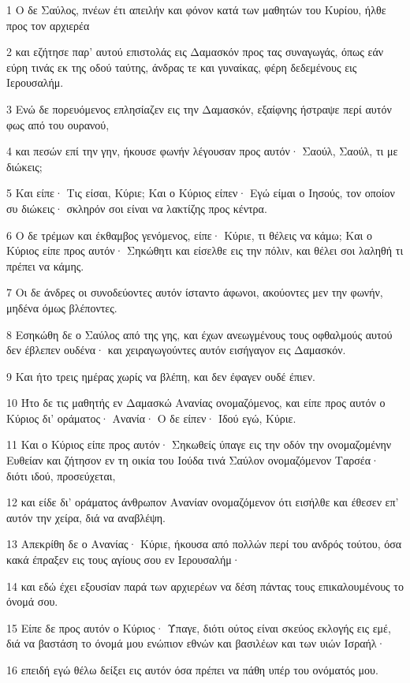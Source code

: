 \par 1 Ο δε Σαύλος, πνέων έτι απειλήν και φόνον κατά των μαθητών του Κυρίου, ήλθε προς τον αρχιερέα
\par 2 και εζήτησε παρ' αυτού επιστολάς εις Δαμασκόν προς τας συναγωγάς, όπως εάν εύρη τινάς εκ της οδού ταύτης, άνδρας τε και γυναίκας, φέρη δεδεμένους εις Ιερουσαλήμ.
\par 3 Ενώ δε πορευόμενος επλησίαζεν εις την Δαμασκόν, εξαίφνης ήστραψε περί αυτόν φως από του ουρανού,
\par 4 και πεσών επί την γην, ήκουσε φωνήν λέγουσαν προς αυτόν· Σαούλ, Σαούλ, τι με διώκεις;
\par 5 Και είπε· Τις είσαι, Κύριε; Και ο Κύριος είπεν· Εγώ είμαι ο Ιησούς, τον οποίον συ διώκεις· σκληρόν σοι είναι να λακτίζης προς κέντρα.
\par 6 Ο δε τρέμων και έκθαμβος γενόμενος, είπε· Κύριε, τι θέλεις να κάμω; Και ο Κύριος είπε προς αυτόν· Σηκώθητι και είσελθε εις την πόλιν, και θέλει σοι λαληθή τι πρέπει να κάμης.
\par 7 Οι δε άνδρες οι συνοδεύοντες αυτόν ίσταντο άφωνοι, ακούοντες μεν την φωνήν, μηδένα όμως βλέποντες.
\par 8 Εσηκώθη δε ο Σαύλος από της γης, και έχων ανεωγμένους τους οφθαλμούς αυτού δεν έβλεπεν ουδένα· και χειραγωγούντες αυτόν εισήγαγον εις Δαμασκόν.
\par 9 Και ήτο τρεις ημέρας χωρίς να βλέπη, και δεν έφαγεν ουδέ έπιεν.
\par 10 Ήτο δε τις μαθητής εν Δαμασκώ Ανανίας ονομαζόμενος, και είπε προς αυτόν ο Κύριος δι' οράματος· Ανανία· Ο δε είπεν· Ιδού εγώ, Κύριε.
\par 11 Και ο Κύριος είπε προς αυτόν· Σηκωθείς ύπαγε εις την οδόν την ονομαζομένην Ευθείαν και ζήτησον εν τη οικία του Ιούδα τινά Σαύλον ονομαζόμενον Ταρσέα· διότι ιδού, προσεύχεται,
\par 12 και είδε δι' οράματος άνθρωπον Ανανίαν ονομαζόμενον ότι εισήλθε και έθεσεν επ' αυτόν την χείρα, διά να αναβλέψη.
\par 13 Απεκρίθη δε ο Ανανίας· Κύριε, ήκουσα από πολλών περί του ανδρός τούτου, όσα κακά έπραξεν εις τους αγίους σου εν Ιερουσαλήμ·
\par 14 και εδώ έχει εξουσίαν παρά των αρχιερέων να δέση πάντας τους επικαλουμένους το όνομά σου.
\par 15 Είπε δε προς αυτόν ο Κύριος· Ύπαγε, διότι ούτος είναι σκεύος εκλογής εις εμέ, διά να βαστάση το όνομά μου ενώπιον εθνών και βασιλέων και των υιών Ισραήλ·
\par 16 επειδή εγώ θέλω δείξει εις αυτόν όσα πρέπει να πάθη υπέρ του ονόματός μου.

